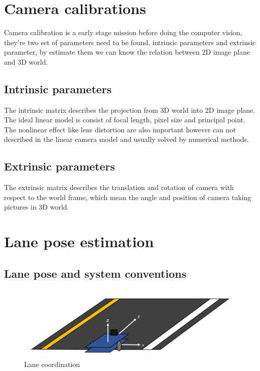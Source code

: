 \documentclass{article}
\begin{document}
\section{Camera calibrations}

Camera calibration is a early stage mission before doing the computer vision, they're two set of parameters need to be found, intrinsic parameters and extrinsic parameter, by estimate them we can know the relation between 2D image plane and 3D world. 

\subsection{Intrinsic parameters}

The intrinsic matrix describes the projection from 3D world into 2D image plane. The ideal linear model is consist of focal length, pixel size and principal point. The nonlinear effect like lens distortion are also important however can not described in the linear camera model and usually solved by numerical methods.

\subsection{Extrinsic parameters}

The extrinsic matrix describes the translation and rotation of camera with respect to the world frame, which mean the angle and position of camera taking pictures in 3D world.

\clearpage

\section{Lane pose estimation}

\subsection{Lane pose and system conventions}
\begin{figure}[ht]
  \label{fig:lane_coordination}
  \centering
  \includegraphics[scale=0.6]{graphs/coordinate_system.PNG}
  \caption{Lane coordination}
\end{figure}
\FloatBarrier
\end{document}
